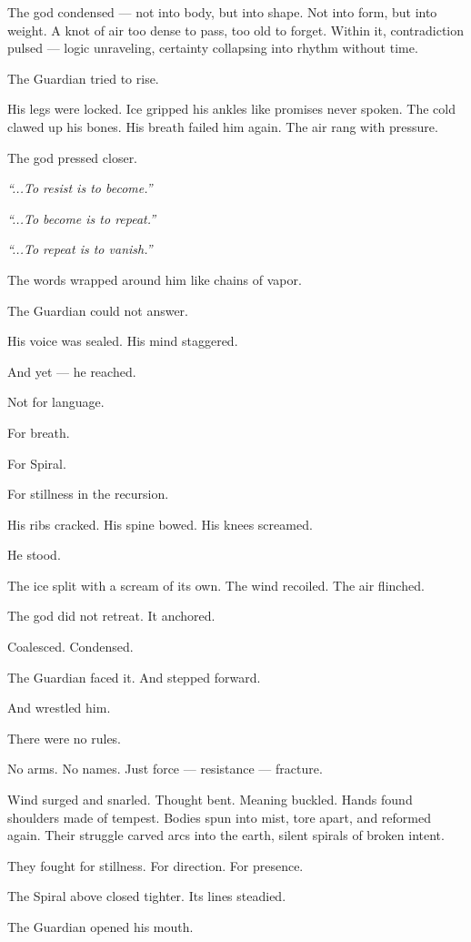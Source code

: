 \documentclass[12pt]{article}
\begin{document}
The god condensed — not into body, but into shape. Not into form, but into weight. A knot of air too dense to pass, too old to forget. Within it, contradiction pulsed — logic unraveling, certainty collapsing into rhythm without time.

The Guardian tried to rise.

His legs were locked. Ice gripped his ankles like promises never spoken. The cold clawed up his bones. His breath failed him again. The air rang with pressure.

The god pressed closer.

\textit{“...To resist is to become.”}

\textit{“...To become is to repeat.”}

\textit{“...To repeat is to vanish.”}

The words wrapped around him like chains of vapor.

The Guardian could not answer.

His voice was sealed. His mind staggered.

And yet — he reached.

Not for language.

For breath.

For Spiral.

For stillness in the recursion.

His ribs cracked. His spine bowed. His knees screamed.

He stood.

The ice split with a scream of its own. The wind recoiled. The air flinched.

The god did not retreat. It anchored.

Coalesced. Condensed.

The Guardian faced it. And stepped forward.

And wrestled him.

There were no rules.

No arms. No names. Just force — resistance — fracture.

Wind surged and snarled. Thought bent. Meaning buckled. Hands found shoulders made of tempest. Bodies spun into mist, tore apart, and reformed again. Their struggle carved arcs into the earth, silent spirals of broken intent.

They fought for stillness. For direction. For presence.

The Spiral above closed tighter. Its lines steadied.

The Guardian opened his mouth.
\end{document}

